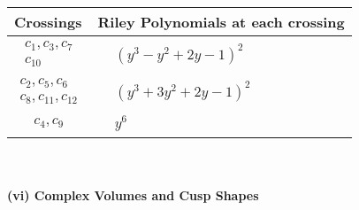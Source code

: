 \documentclass[1p]{elsarticle_modified}
\theoremstyle{definition}
\begin{document}
\begin{tabular}{m{50pt}|m{274pt}}
Crossings & \hspace{64pt}Riley Polynomials at each crossing \\
\hline $$\begin{aligned}c_{1},c_{3},c_{7}\\c_{10}\end{aligned}$$&$\begin{aligned}
&(y^3- y^2+2 y-1)^2
\end{aligned}$\\
\hline $$\begin{aligned}c_{2},c_{5},c_{6}\\c_{8},c_{11},c_{12}\end{aligned}$$&$\begin{aligned}
&(y^3+3 y^2+2 y-1)^2
\end{aligned}$\\
\hline $$\begin{aligned}c_{4},c_{9}\end{aligned}$$&$\begin{aligned}
&y^6
\end{aligned}$\\
\hline
\end{tabular}\\~\\
\newpage\flushleft \textbf{(vi) Complex Volumes and Cusp Shapes}
\end{document}
